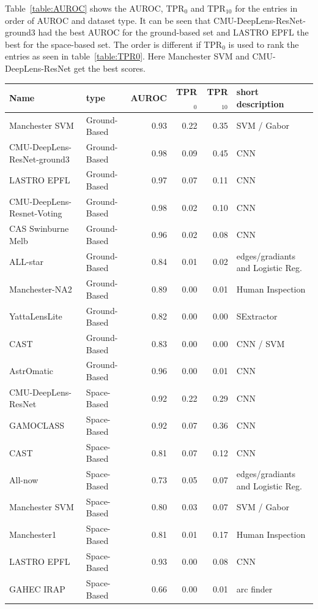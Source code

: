 \documentclass[useAMS,usenatbib]{mnras}
\begin{document}
Table~\ref{table:AUROC} shows the AUROC, TPR$_0$ and TPR$_{10}$ for the entries in order of AUROC and dataset type.  It can be seen that CMU-DeepLens-ResNet-ground3 had the best AUROC for the ground-based set and LASTRO EPFL the best for the space-based set.  The order is different if TPR$_0$ is used to rank the entries as seen in table~\ref{table:TPR0}.  Here Manchester SVM and 
CMU-DeepLens-ResNet get the best scores.

\begin{table}
\centering
\begin{tabular}{llrrrl}
  \hline
  Name & type & AUROC & TPR$_0$ & TPR$_{10}$ & short description \\ 
  \hline
 Manchester SVM & Ground-Based & 0.93 & 0.22 & 0.35 & SVM / Gabor \\ 
  CMU-DeepLens-ResNet-ground3 & Ground-Based & 0.98 & 0.09 & 0.45 & CNN \\ 
  LASTRO EPFL & Ground-Based & 0.97 & 0.07 & 0.11 & CNN \\ 
   CMU-DeepLens-Resnet-Voting & Ground-Based & 0.98 & 0.02 & 0.10 & CNN \\ 
   CAS Swinburne Melb & Ground-Based & 0.96 & 0.02 & 0.08 & CNN \\ 
   ALL-star & Ground-Based & 0.84 & 0.01 & 0.02 & edges/gradiants and Logistic Reg. \\ 
   Manchester-NA2 & Ground-Based & 0.89 & 0.00 & 0.01 & Human Inspection \\ 
   YattaLensLite & Ground-Based & 0.82 & 0.00 & 0.00 & SExtractor \\ 
   CAST & Ground-Based & 0.83 & 0.00 & 0.00 & CNN / SVM \\ 
   AstrOmatic & Ground-Based & 0.96 & 0.00 & 0.01 & CNN \\ 
   CMU-DeepLens-ResNet & Space-Based & 0.92 & 0.22 & 0.29 & CNN \\ 
   GAMOCLASS & Space-Based & 0.92 & 0.07 & 0.36 & CNN \\ 
   CAST & Space-Based & 0.81 & 0.07 & 0.12 & CNN \\ 
   All-now & Space-Based & 0.73 & 0.05 & 0.07 & edges/gradiants and Logistic Reg. \\ 
   Manchester SVM & Space-Based & 0.80 & 0.03 & 0.07 & SVM / Gabor \\ 
   Manchester1 & Space-Based & 0.81 & 0.01 & 0.17 & Human Inspection \\ 
   LASTRO EPFL & Space-Based & 0.93 & 0.00 & 0.08 & CNN \\ 
   GAHEC IRAP & Space-Based & 0.66 & 0.00 & 0.01 & arc finder \\ 

\end{tabular}
\end{table}
\end{document}
